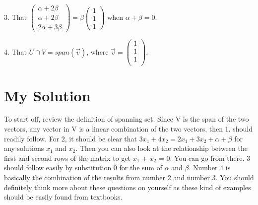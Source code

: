 \documentclass{article}
\begin{document}
3. That $\begin{pmatrix}\alpha + 2\beta\\ \alpha + 2\beta\\ 2\alpha + 3\beta\end{pmatrix}=\beta\begin{pmatrix}1\\ 1\\ 1\end{pmatrix}$ when $\alpha+\beta=0$.

4. That $U\cap V=span(\vec{v})$, where $\vec{v}=\begin{pmatrix}1 \\ 1\\ 1\\ \end{pmatrix}$.
\section{My Solution}
To start off, review the definition of spanning set. Since V is the span of the two vectors, any vector in V is a linear combination of the two vectors, then  1. should readily follow.
For 2, it should be clear that $3x_1+4x_2=2x_1+3x_2+\alpha + \beta $ for any solutions $x_1$ and $x_2$. Then you can also look at the relationship between the first and second rows of the matrix to get $x_1 $ + $ x_2$ = 0. You can go from there. 3 should follow easily by substitution $0$ for the sum of $\alpha$ and $\beta$. Number 4 is basically the combination of the results from number 2 and number 3. You should definitely think more about these questions on yourself as these kind of examples should be easily found from textbooks.
\end{document}
